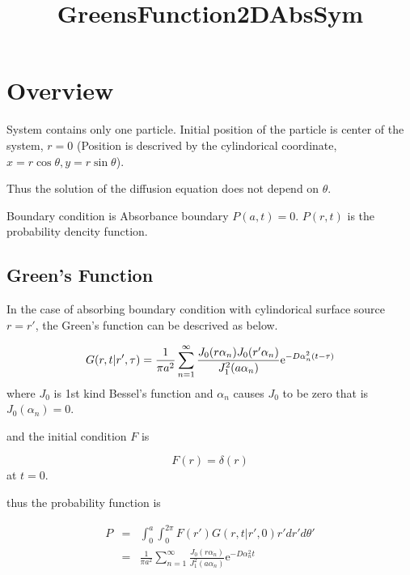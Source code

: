 \documentclass{article}
\begin{document}
\title{GreensFunction2DAbsSym}
\maketitle

\section{Overview}

System contains only one particle.
Initial position of the particle is center of the system, $r=0$
(Position is descrived by the cylindorical coordinate,
 $x = r\cos\theta, y = r\sin\theta$).

Thus the solution of the diffusion equation does not depend on $\theta$.

Boundary condition is Absorbance boundary $P(a,t) = 0$.
$P(r, t)$ is the probability dencity function.

\subsection{Green's Function}

In the case of absorbing boundary condition with cylindorical surface source
$r = r'$,
the Green's function can be descrived as below.

\begin{equation}
    G(r, t | r', \tau) = \frac{1}{\pi a^2}\sum^{\infty}_{n=1}
                         \frac{J_0(r\alpha_n)J_0(r'\alpha_n)}{J^2_1(a\alpha_n)}
                         \mathrm{e}^{-D\alpha^2_n (t - \tau)} \nonumber \\
\end{equation}
where $J_0$ is 1st kind Bessel's function
and $\alpha_n$ causes $J_0$ to be zero that is $J_0(\alpha_n) = 0$.

and the initial condition $F$ is

\begin{equation}
    F(r) = \delta(r)
\end{equation}
at $t=0$.

thus the probability function is

\begin{eqnarray}
    P &=& \int^a_0 \int^{2\pi}_0 F(r') G(r, t | r', 0) r'dr'd\theta'
          \nonumber \\
      &=& \frac{1}{\pi a^2}\sum^{\infty}_{n=1}
          \frac{J_0(r\alpha_n)}{J^2_1(a\alpha_n)}\mathrm{e}^{-D\alpha^2_n t}
          \nonumber
\end{eqnarray}
\end{document}
